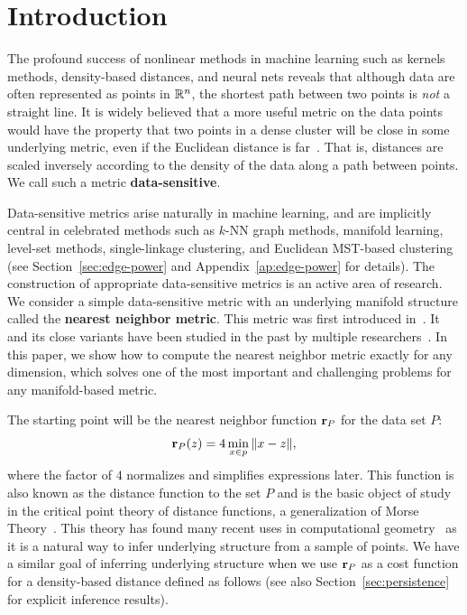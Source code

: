 \section{Introduction}

The profound success of nonlinear methods in machine learning such as kernels methods, density-based distances, and neural nets reveals that although data are often represented as points in $\mathbb{R}^n$, the shortest path between two points is \emph{not} a straight line.
It is widely believed that a more useful metric on the data points would
have the property that two points in a dense cluster will be close in some
underlying metric, even if the Euclidean distance is
far~\cite{alamgir12shortest,
cohen15approximating, vincent03, bijral11semiSupLearningDBD}.
That is, distances are scaled inversely according to the density of the data along a path between points.
We call such a metric \textbf{data-sensitive}.

Data-sensitive metrics arise naturally in machine learning, and are
implicitly central in celebrated methods such as $k$-NN graph methods,
manifold learning, level-set methods, single-linkage clustering, and
Euclidean MST-based clustering (see Section~\ref{sec:edge-power} and
Appendix~\ref{ap:edge-power} for details).
The construction of appropriate data-sensitive metrics is an active area of research.
We consider a simple data-sensitive metric with an underlying manifold structure called the \textbf{nearest neighbor metric}.
This metric was first introduced in~\cite{cohen15approximating}. It and its close variants have been studied in the past by
multiple
researchers~\cite{hwang2016, cohen15approximating, sajama05estimatingDBDM,
bijral11semiSupLearningDBD,vincent03}.
In this paper, we show how to compute the nearest neighbor metric exactly
for any dimension, which solves one of the most important and challenging
problems for any manifold-based metric.

The starting point will be the nearest neighbor function $\mathbf{r}_P$ for
the data set $P$:
\[
\mathbf{r}_P(z) = 4\min_{x\in p} \|x-z\|,
\]
where the factor of $4$ normalizes and simplifies expressions later.
This function is also known as the distance function to the set $P$ and is the basic object of study in the critical point theory of distance functions, a generalization of Morse Theory~\cite{grove93critical}.
This theory has found many recent uses in computational geometry~\cite{chazal08smooth,chazal09sampling} as it is a natural way to infer underlying structure from a sample of points.
We have a similar goal of inferring underlying structure when we use $\mathbf{r}_P$ as a cost function for a density-based distance defined as follows (see also Section~\ref{sec:persistence} for explicit inference results).

